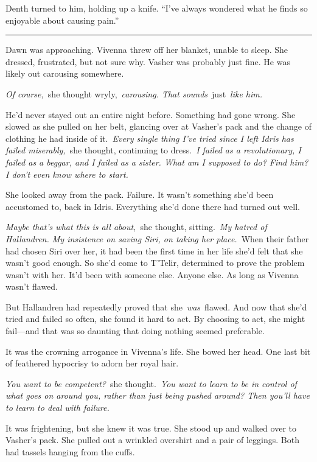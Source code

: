Denth turned to him, holding up a knife. “I’ve always wondered what he finds so enjoyable about causing pain.”

\bigskip \hrule \bigskip

Dawn was approaching. Vivenna threw off her blanket, unable to sleep. She dressed, frustrated, but not sure why. Vasher was probably just fine. He was likely out carousing somewhere.

\textit{Of course,}~she thought wryly,~\textit{carousing. That sounds}~just~\textit{like him.}

He’d never stayed out an entire night before. Something had gone wrong. She slowed as she pulled on her belt, glancing over at Vasher’s pack and the change of clothing he had inside of it.~\textit{Every single thing I’ve tried since I left Idris has failed miserably,}~she thought, continuing to dress.~\textit{I failed as a revolutionary, I failed as a beggar, and I failed as a sister. What am I supposed to do? Find him? I don’t even know where to start.}

She looked away from the pack. Failure. It wasn’t something she’d been accustomed to, back in Idris. Everything she’d done there had turned out well.

\textit{Maybe that’s what this is all about,}~she thought, sitting.~\textit{My hatred of Hallandren. My insistence on saving Siri, on taking her place.}~When their father had chosen Siri over her, it had been the first time in her life she’d felt that she wasn’t good enough. So she’d come to T’Telir, determined to prove the problem wasn’t with her. It’d been with someone else. Anyone else. As long as Vivenna wasn’t flawed.

But Hallandren had repeatedly proved that she~\textit{was}~flawed. And now that she’d tried and failed so often, she found it hard to act. By choosing to act, she might fail—and that was so daunting that doing nothing seemed preferable.

It was the crowning arrogance in Vivenna’s life. She bowed her head. One last bit of feathered hypocrisy to adorn her royal hair.

\textit{You want to be competent?}~she thought.~\textit{You want to learn to be in control of what goes on around you, rather than just being pushed around? Then you’ll have to learn to deal with failure.}

It was frightening, but she knew it was true. She stood up and walked over to Vasher’s pack. She pulled out a wrinkled overshirt and a pair of leggings. Both had tassels hanging from the cuffs.

